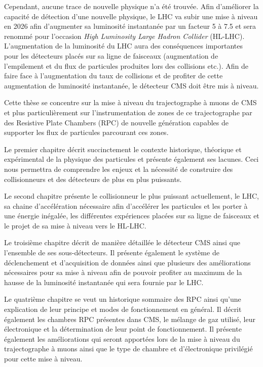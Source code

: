 Cependant, aucune trace de nouvelle physique n'a été trouvée. Afin d'améliorer la capacité de détection d'une nouvelle physique, le LHC va subir une mise à niveau en \num{2026} afin d'augmenter sa luminosité instantanée par un facteur \num{5} à \num{7.5} et sera renommé pour l'occasion \textit{High Luminosity Large Hadron Collider} (HL-LHC). L'augmentation de la luminosité du LHC aura des conséquences importantes pour les détecteurs placés sur sa ligne de faisceaux (augmentation de l'empilement et du flux de particules produites lors des collisions etc.). Afin de faire face à l'augmentation du taux de collisions et de profiter de cette augmentation de luminosité instantanée, le détecteur CMS doit être mis à niveau. 

Cette thèse se concentre sur la mise à niveau du trajectographe à muons de CMS et plus particulièrement sur l'instrumentation de zones de ce trajectographe par des Resistive Plate Chambers (RPC) de nouvelle génération capables de supporter les flux de particules parcourant ces zones. 

Le premier chapitre décrit succinctement le contexte historique, théorique et expérimental de la physique des particules et présente également ses lacunes. Ceci nous permettra de comprendre les enjeux et la nécessité de construire des collisionneurs et des détecteurs de plus en plus puissants.

Le second chapitre présente le collisionneur le plus puissant actuellement, le LHC, sa chaine d'accélération nécessaire afin d'accélérer les particules et les porter à une énergie inégalée, les différentes expériences placées sur sa ligne de faisceaux et le projet de sa mise à niveau vers le HL-LHC.

Le troisième chapitre décrit de manière détaillée le détecteur CMS ainsi que l'ensemble de ses sous-détecteurs. Il présente également le système de déclenchement et d'acquisition de données ainsi que plusieurs des améliorations nécessaires pour sa mise à niveau afin de pouvoir profiter au maximum de la hausse de la luminosité instantanée qui sera fournie par le LHC.

Le quatrième chapitre se veut un historique sommaire des RPC ainsi qu'une explication de leur principe et modes de fonctionnement en général. Il décrit également les chambres RPC présentes dans CMS, le mélange de gaz utilisé, leur électronique et la détermination de leur point de fonctionnement. Il présente également les améliorations qui seront apportées lors de la mise à niveau du trajectographe à muons ainsi que le type de chambre et d'électronique privilégié pour cette mise à niveau.

